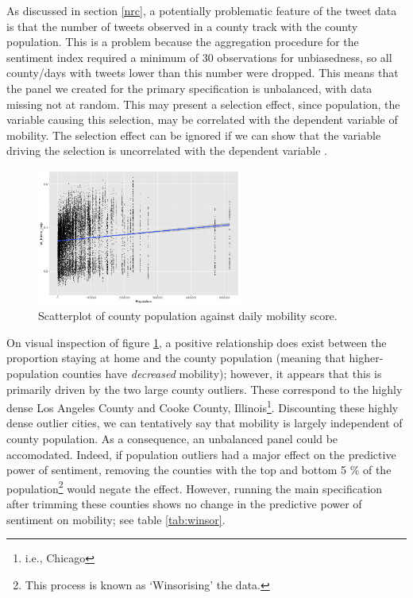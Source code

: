 \documentclass{article}
\begin{document}
As discussed in section \ref{nrc}, a potentially problematic feature of the tweet data is that the number of tweets observed in a county track with the county population. This is a problem because the aggregation procedure for the sentiment index required a minimum of 30 observations for unbiasedness, so all county/days with tweets lower than this number were dropped. This means that the panel we created for the primary specification is unbalanced, with data missing not at random. This may present a selection effect, since population, the variable causing this selection, may be correlated with the dependent variable of mobility. The selection effect can be ignored if we can show that the variable driving the selection is uncorrelated with the dependent variable \parencite[552]{wooldridgeEconometricAnalysisCross2010}. 
\begin{figure}[!htb]
  \centering
  \caption{Scatterplot of county population against daily mobility score.}
  \label{popvsmobil}
  \includegraphics[width=0.6\textwidth]{figs/popvsmobil.png}
\end{figure}
On visual inspection of figure \ref{popvsmobil}, a positive relationship does exist between the proportion staying at home and the county population (meaning that higher-population counties have \textit{decreased} mobility); however, it appears that this is primarily driven by the two large county outliers. These correspond to the highly dense Los Angeles County and Cooke County, Illinois\footnote{i.e., Chicago}. Discounting these highly dense outlier cities, we can tentatively say that mobility is largely independent of county population. As a consequence, an unbalanced panel could be accomodated. Indeed, if population outliers had a major effect on the predictive power of sentiment, removing the counties with the top and bottom 5 \% of the population\footnote{This process is known as `Winsorising' the data.} would negate the effect. However, running the main specification after trimming these counties shows no change in the predictive power of sentiment on mobility; see table \ref{tab:winsor}.
\end{document}
